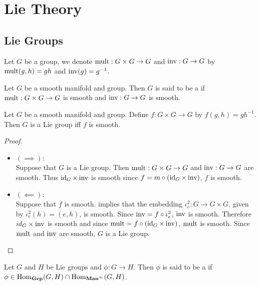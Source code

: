 \documentclass{book}
\begin{document}
\newpage
\chapter{Lie Theory}

\section{Lie Groups}

\begin{defn}
	Let $G$ be a group, we denote $\operatorname{\text{mult}}:G \times G \rightarrow G$ and $\operatorname{\text{inv}}: G \rightarrow G$ by $\operatorname{\text{mult}}(g, h) = gh$ and $\operatorname{\text{inv}}(g) = g^{-1}$.
\end{defn}

\begin{defn}
	Let $G$ be a smooth manifold and group. Then $G$ is said to be a  if $\operatorname{\text{mult}}:G \times G \rightarrow G$ is smooth and $\operatorname{\text{inv}}: G \rightarrow G$ is smooth.
\end{defn}

\begin{ex}
	Let $G$ be a smooth manifold and group. Define $f:G \times G \rightarrow G$ by $f(g, h) = g h^{-1}$. Then $G$ is a Lie group iff $f$ is smooth. 
\end{ex}

\begin{proof}\
	\begin{itemize}
		\item $(\implies)$: \\
		Suppose that $G$ is a Lie group. Then $\operatorname{\text{mult}}:G \times G \rightarrow G$ and $\operatorname{\text{inv}}:G \rightarrow G$ are smooth. Thus $\operatorname{id}_G \times \operatorname{\text{inv}}$ is smooth since $f = m \circ (\operatorname{id}_G \times \operatorname{\text{inv}})$, $f$ is smooth. 
		\item $(\impliedby)$: \\
		Suppose that $f$ is smooth.   implies that the embedding $\iota^2_e: G \rightarrow G \times G$, given by $\iota^2_e(h) = (e, h)$, is smooth. Since $\operatorname{\text{inv}} = f \circ \iota^2_e$, $\operatorname{\text{inv}}$ is smooth. Therefore $id_G \times \operatorname{\text{inv}}$ is smooth and since $\operatorname{\text{mult}} = f \circ (\operatorname{id}_G \times \operatorname{\text{inv}})$, $\operatorname{\text{mult}}$ is smooth. Since $\operatorname{\text{mult}}$ and $\operatorname{\text{inv}}$ are smooth, $G$ is a Lie group.
	\end{itemize}
\end{proof}

\begin{ex}
	Let $G$ and $H$ be Lie groups and $\phi: G \rightarrow H$. Then $\phi$ is said to be a  if $\phi \in \operatorname{Hom}_{\operatorname*{\text{\textbf{Grp}}}}(G, H) \cap \operatorname{Hom}_{\operatorname*{\text{\textbf{Man}}^{\infty}}}(G, H)$.
\end{ex}
\end{document}
